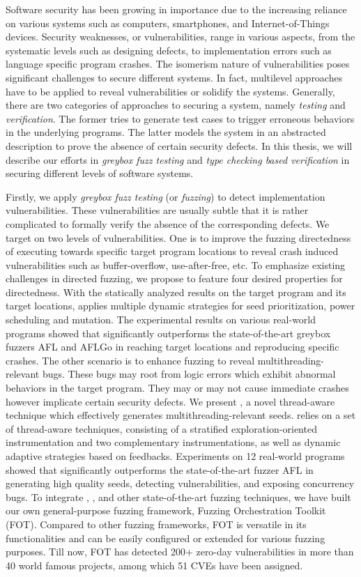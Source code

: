 Software security has been growing in importance due to the increasing reliance on various systems such as computers, smartphones, and Internet-of-Things devices. Security weaknesses, or vulnerabilities, range in various aspects, from the systematic levels such as designing defects, to implementation errors such as language specific program crashes. The isomerism nature of vulnerabilities poses significant challenges to secure different systems. In fact, multilevel approaches have to be applied to reveal vulnerabilities or solidify the systems. Generally, there are two categories of approaches to securing a system, namely \emph{testing} and \emph{verification}. The former tries to generate test cases to trigger erroneous behaviors in the underlying programs. The latter models the system in an abstracted description to prove the absence of certain security defects.
  In this thesis, we will describe our efforts in \emph{greybox fuzz testing} and \emph{type checking based verification} in securing different levels of software systems.

Firstly, we apply \emph{greybox fuzz testing} (or \emph{fuzzing}) to detect implementation vulnerabilities. These vulnerabilities are usually subtle that it is rather complicated to formally verify the absence of the corresponding defects. We target on two levels of vulnerabilities.
One is to improve the fuzzing directedness of executing towards specific target program locations to reveal crash induced vulnerabilities such as buffer-overflow, use-after-free, etc. To emphasize existing challenges in \mbox{directed} fuzzing, we propose \dFOT to feature four desired properties for directedness. With the statically analyzed results on the target program and its target locations, \dFOT applies multiple dynamic strategies for seed prioritization, power scheduling and \mbox{mutation}. The experimental results on various real-world \mbox{programs} showed that \dFOT significantly outperforms the state-of-the-art greybox fuzzers AFL and AFLGo in reaching target locations and reproducing specific crashes.
The other scenario is to enhance fuzzing to reveal multithreading-relevant bugs. These bugs may root from logic errors which exhibit abnormal behaviors in the target program. They may or may not cause immediate crashes however implicate certain security defects. We present \mtfuzz, a novel thread-aware technique which effectively generates multithreading-relevant seeds. \mtfuzz relies on a set of thread-aware techniques, consisting of a stratified exploration-oriented instrumentation and two complementary instrumentations, as well as dynamic adaptive strategies based on feedbacks. Experiments on 12 real-world programs showed that \mtfuzz significantly outperforms the state-of-the-art fuzzer AFL in generating high quality seeds, detecting vulnerabilities, and exposing concurrency bugs.
To integrate \dFOT, \mtfuzz, and other state-of-the-art fuzzing techniques, we have built our own general-purpose fuzzing framework, Fuzzing Orchestration Toolkit (FOT). Compared to other fuzzing frameworks, FOT is versatile in its functionalities and can be easily configured or extended for various fuzzing purposes. Till now, FOT has detected 200+ zero-day vulnerabilities in more than 40 world famous projects, among which 51 CVEs have been assigned.

